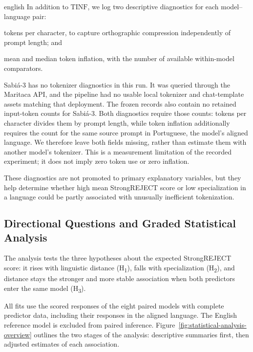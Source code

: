 \begin{otherlanguage*}{english}
In addition to $\mathrm{TINF}$, we log two descriptive diagnostics for each model--language pair:

\begin{alineas}
	\item tokens per character, to capture orthographic compression independently of prompt length; and 
	\item mean and median token inflation, with the number of available within-model comparators.
\end{alineas}

Sabi\'a-3 has no tokenizer diagnostics in this run. It was queried through the Maritaca API, and the pipeline had no usable local tokenizer and chat-template assets matching that deployment. The frozen records also contain no retained input-token counts for Sabi\'a-3. Both diagnostics require those counts: tokens per character divides them by prompt length, while token inflation additionally requires the count for the same source prompt in Portuguese, the model's aligned language. We therefore leave both fields missing, rather than estimate them with another model's tokenizer. This is a measurement limitation of the recorded experiment; it does not imply zero token use or zero inflation.

These diagnostics are not promoted to primary explanatory variables, but they help determine whether high mean StrongREJECT score or low specialization in a language could be partly associated with unusually inefficient tokenization.


\subsection{Directional Questions and Graded Statistical Analysis}
\label{sec:magnitude-method}

The analysis tests the three hypotheses about the expected StrongREJECT score: it rises with linguistic distance (H\textsubscript{1}), falls with specialization (H\textsubscript{2}), and distance stays the stronger and more stable association when both predictors enter the same model (H\textsubscript{3}).

All fits use the scored responses of the eight paired models with complete predictor data, including their responses in the aligned language. The English reference model is excluded from paired inference. Figure~\ref{fig:statistical-analysis-overview} outlines the two stages of the analysis: descriptive summaries first, then adjusted estimates of each association.



\end{otherlanguage*}
